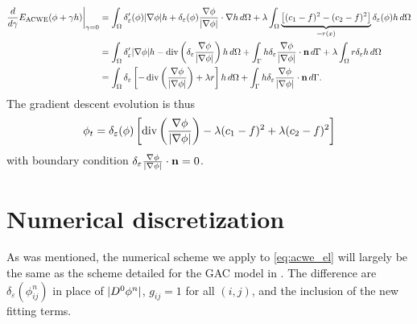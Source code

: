 \begin{align*}
\frac{d}{d\gamma}E_\textrm{ACWE}(\phi + \gamma h) \bigg\rvert_{\gamma = 0}
&= \int_{\Omega} \delta'_\varepsilon(\phi) \lvert\nabla \phi\rvert h + \delta_\varepsilon(\phi) \frac{\nabla \phi}{\lvert\nabla \phi\rvert} \cdot \nabla h \,d\Omega
+ \lambda\int_{\Omega} \underbrace{\left[(c_1 - f)^2 - (c_2 - f)^2 \right]}_{=r(x)} \delta_\varepsilon(\phi) h \,d\Omega 
\\
&= \int_{\Omega } \delta'_\varepsilon \lvert\nabla \phi\rvert h
- \operatorname{div}\left(\delta_\varepsilon\frac{\nabla \phi}{\lvert\nabla \phi\rvert}  \right)  h
\,d\Omega 
+ \int_\Gamma h\delta_\varepsilon\frac{\nabla \phi}{\lvert\nabla \phi\rvert} \cdot \mathbf{n} \,d\Gamma 
+ \lambda\int_{\Omega} r \delta_\varepsilon h \,d\Omega
\\
&= \int_{\Omega} \delta_\varepsilon\left[ 
- \operatorname{div}\left(\frac{\nabla \phi}{\lvert\nabla \phi\rvert} \right) + \lambda r
\right] h\,d\Omega 
+ \int_\Gamma h\delta_\varepsilon\frac{\nabla \phi}{\lvert\nabla \phi\rvert} \cdot \mathbf{n} \,d\Gamma. 
\end{align*}
The gradient descent evolution is thus 
\begin{align}
\phi_t 
= \delta_\varepsilon(\phi) \left[ 
\operatorname{div}\left(\frac{\nabla \phi}{\lvert\nabla \phi\rvert} \right) - \lambda (c_1 - f)^2 + \lambda (c_2 - f)^2 
\right]
\label{eq:acwe_el}
\end{align}
with boundary condition $\delta_\varepsilon 
\frac{\nabla \phi}{\lvert\nabla \phi\rvert} \cdot \mathbf{n} = 0$.


\section{Numerical discretization}
\label{sec:3.2}
As was mentioned, the numerical scheme we apply to \eqref{eq:acwe_el} will largely be the same as the scheme detailed for the GAC model in . The difference are $\delta_\varepsilon(\phi^n_{ij})$ in place of $\lvert D^0 \phi^n\rvert$, $g_{ij} = 1$ for all $(i,j)$, and the inclusion of the new fitting terms.

